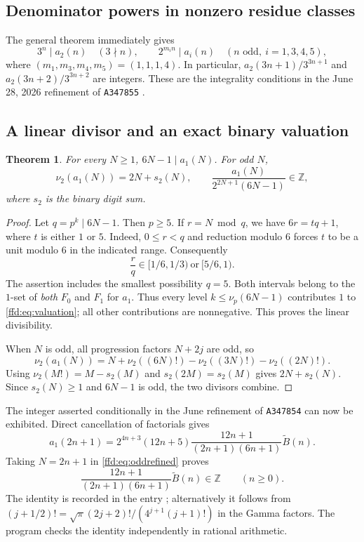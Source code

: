 \documentclass[11pt]{article}
\newtheorem{theorem}{Theorem}[section]
\theoremstyle{definition}
\theoremstyle{remark}
\newcommand{\Z}{\mathbb Z}
\newcommand{\nup}{\nu_p}
\newcommand{\OEIS}[1]{\texttt{#1}}
\newcommand{\tB}{\widetilde B}
\begin{document}
\subsection{Denominator powers in nonzero residue classes}\label{ffd:sec:powers}
The general theorem immediately gives
\begin{equation}
 3^n\mid a_2(n)\quad(3\nmid n),\qquad
 2^{m_i n}\mid a_i(n)\quad(n\text{ odd},\ i=1,3,4,5),
 \label{ffd:eq:powers}
\end{equation}
where $(m_1,m_3,m_4,m_5)=(1,1,1,4)$. In particular,
$a_2(3n+1)/3^{3n+1}$ and $a_2(3n+2)/3^{3n+2}$ are integers. These are the
integrality conditions in the June 28, 2026 refinement of \OEIS{A347855}
\cite{ffd-oeis855}.

\subsection{A linear divisor and an exact binary valuation}\label{ffd:sec:linear}
\begin{theorem}\label{ffd:thm:oddrefinement}
For every $N\ge1$, $6N-1\mid a_1(N)$. For odd $N$,
\begin{equation}
 \nu_2(a_1(N))=2N+s_2(N),\qquad
 \frac{a_1(N)}{2^{2N+1}(6N-1)}\in\Z,
 \label{ffd:eq:oddrefined}
\end{equation}
where $s_2$ is the binary digit sum.
\end{theorem}
\begin{proof}
Let $q=p^k\mid6N-1$. Then $p\ge5$. If $r=N\bmod q$, we have
$6r=tq+1$, where $t$ is either $1$ or $5$. Indeed, $0\le r<q$ and reduction
modulo $6$ forces $t$ to be a unit modulo $6$ in the indicated range.
Consequently
\[
 \frac rq\in[1/6,1/3)\ \text{or}\ [5/6,1).
\]
The assertion includes the smallest possibility $q=5$. Both intervals belong
to the $1$-set of \emph{both} $F_0$ and $F_1$ for $a_1$. Thus every level
$k\le\nup(6N-1)$ contributes $1$ to \eqref{ffd:eq:valuation}; all other contributions
are nonnegative. This proves the linear divisibility.

When $N$ is odd, all progression factors $N+2j$ are odd, so
\[
 \nu_2(a_1(N))=N+\nu_2((6N)!)-\nu_2((3N)!)-\nu_2((2N)!).
\]
Using $\nu_2(M!)=M-s_2(M)$ and $s_2(2M)=s_2(M)$ gives
$2N+s_2(N)$. Since $s_2(N)\ge1$ and $6N-1$ is odd, the two divisors combine.
\end{proof}

The integer asserted conditionally in the June refinement of \OEIS{A347854}
can now be exhibited. Direct cancellation of factorials gives
\begin{equation}
 a_1(2n+1)=2^{4n+3}(12n+5)
 \frac{12n+1}{(2n+1)(6n+1)}\tB(n).
 \label{ffd:eq:oddB}
\end{equation}
Taking $N=2n+1$ in \eqref{ffd:eq:oddrefined} proves
\begin{equation}
 \frac{12n+1}{(2n+1)(6n+1)}\tB(n)\in\Z\qquad(n\ge0).
 \label{ffd:eq:Bref}
\end{equation}
The identity is recorded in the entry \cite{ffd-oeis854}; alternatively it follows
from $(j+1/2)!=\sqrt\pi(2j+2)!/(4^{j+1}(j+1)!)$ in the Gamma factors.
The program checks the identity independently in rational arithmetic.
\end{document}
